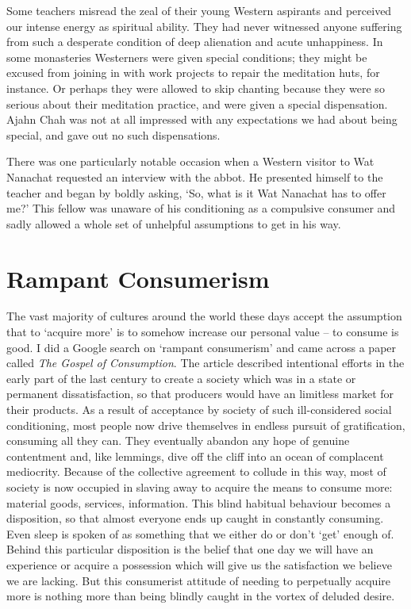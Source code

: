 Some teachers misread the zeal of their young Western aspirants and
perceived our intense energy as spiritual ability. They had never
witnessed anyone suffering from such a desperate condition of deep
alienation and acute unhappiness. In some monasteries Westerners were
given special conditions; they might be excused from joining in with
work projects to repair the meditation huts, for instance. Or perhaps
they were allowed to skip chanting because they were so serious about
their meditation practice, and were given a special dispensation. Ajahn
Chah was not at all impressed with any expectations we had about being
special, and gave out no such dispensations.

There was one particularly notable occasion when a Western visitor to
Wat Nanachat requested an interview with the abbot. He presented himself
to the teacher and began by boldly asking, ‘So, what is it Wat Nanachat
has to offer me?’ This fellow was unaware of his conditioning as a
compulsive consumer and sadly allowed a whole set of unhelpful
assumptions to get in his way.

\section{Rampant Consumerism}

The vast majority of cultures around the world these days accept the
assumption that to ‘acquire more’ is to somehow increase our personal
value – to consume is good. I did a Google search on ‘rampant
consumerism’ and came across a paper called \emph{The Gospel of
Consumption}\cite{gospel}.
The article described intentional efforts in the early part of the
last century to create a society which was in a state or permanent
dissatisfaction, so that producers would have an limitless market for
their products. As a result of acceptance by society of such
ill-considered social conditioning, most people now drive themselves in
endless pursuit of gratification, consuming all they can. They
eventually abandon any hope of genuine contentment and, like lemmings,
dive off the cliff into an ocean of complacent mediocrity. Because of
the collective agreement to collude in this way, most of society is now
occupied in slaving away to acquire the means to consume more: material
goods, services, information. This blind habitual behaviour becomes a
disposition, so that almost everyone ends up caught in constantly
consuming. Even sleep is spoken of as something that we either do or
don’t ‘get’ enough of. Behind this particular disposition is the belief
that one day we will have an experience or acquire a possession which
will give us the satisfaction we believe we are lacking. But this
consumerist attitude of needing to perpetually acquire more is nothing
more than being blindly caught in the vortex of deluded desire.

